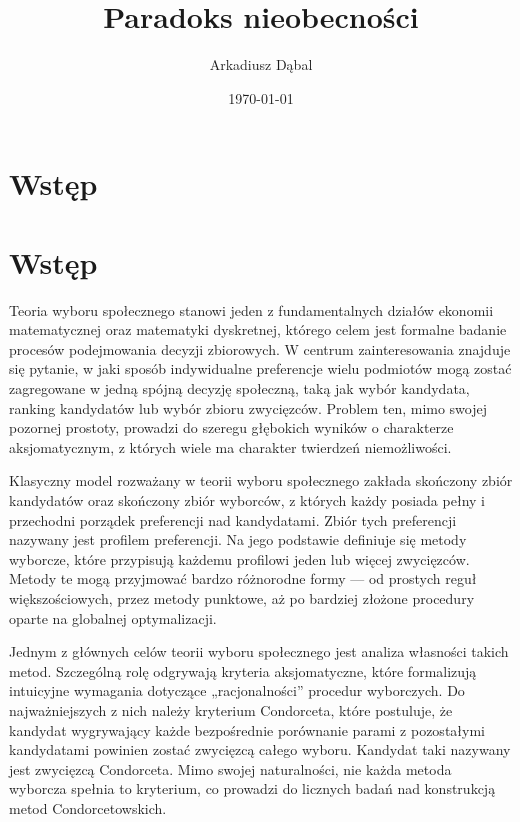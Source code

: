\documentclass[12pt,a4paper]{mwrep}
\title{Paradoks nieobecności}
\author{Arkadiusz Dąbal}
\date{\today}
\begin{document}
	\renewcommand{\proofname}{Dowód}
	\maketitle
	\thispagestyle{empty}
		
	\newpage
	
	\tableofcontents
		
	\chapter*{Wstęp}
	
	\chapter*{Wstęp}
	
	Teoria wyboru społecznego stanowi jeden z fundamentalnych działów ekonomii matematycznej oraz matematyki dyskretnej, którego celem jest formalne badanie procesów podejmowania decyzji zbiorowych. W centrum zainteresowania znajduje się pytanie, w jaki sposób indywidualne preferencje wielu podmiotów mogą zostać zagregowane w jedną spójną decyzję społeczną, taką jak wybór kandydata, ranking kandydatów lub wybór zbioru zwycięzców. Problem ten, mimo swojej pozornej prostoty, prowadzi do szeregu głębokich wyników o charakterze aksjomatycznym, z których wiele ma charakter twierdzeń niemożliwości.
	
	Klasyczny model rozważany w teorii wyboru społecznego zakłada skończony zbiór kandydatów oraz skończony zbiór wyborców, z których każdy posiada pełny i przechodni porządek preferencji nad kandydatami. Zbiór tych preferencji nazywany jest profilem preferencji. Na jego podstawie definiuje się metody wyborcze, które przypisują każdemu profilowi jeden lub więcej zwycięzców. Metody te mogą przyjmować bardzo różnorodne formy — od prostych reguł większościowych, przez metody punktowe, aż po bardziej złożone procedury oparte na globalnej optymalizacji.
	
	Jednym z głównych celów teorii wyboru społecznego jest analiza własności takich metod. Szczególną rolę odgrywają kryteria aksjomatyczne, które formalizują intuicyjne wymagania dotyczące „racjonalności” procedur wyborczych. Do najważniejszych z nich należy kryterium Condorceta, które postuluje, że kandydat wygrywający każde bezpośrednie porównanie parami z pozostałymi kandydatami powinien zostać zwycięzcą całego wyboru. Kandydat taki nazywany jest zwycięzcą Condorceta. Mimo swojej naturalności, nie każda metoda wyborcza spełnia to kryterium, co prowadzi do licznych badań nad konstrukcją metod Condorcetowskich.
	
\end{document}
